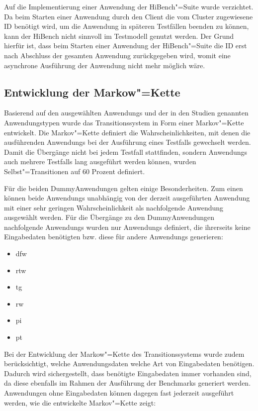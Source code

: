 Auf die Implementierung einer \gls{Anwendung} der HiBench"=Suite wurde verzichtet.
Da beim Starten einer \gls{Anwendung} durch den Client die vom Cluster zugewiesene ID benötigt wird, um die \gls{Anwendung} in späteren Testfällen beenden zu können, kann der HiBench nicht sinnvoll im Testmodell genutzt werden.
Der Grund hierfür ist, dass beim Starten einer \gls{Anwendung} der HiBench"=Suite die ID erst nach Abschluss der gesamten \gls{Anwendung} zurückgegeben wird, womit eine asynchrone Ausführung der \gls{Anwendung} nicht mehr möglich wäre.

\subsection{Entwicklung der Markow"=Kette}
\label{subsec:markovChain}

Basierend auf den ausgewählten \glspl{Anwendung} und der in den Studien genannten Anwendungstypen wurde das Transitionssystem in Form einer Markov"=Kette entwickelt.
Die Markov"=Kette definiert die Wahrscheinlichkeiten, mit denen die ausführenden \glspl{Anwendung} bei der Ausführung eines Testfalls gewechselt werden.
Damit die Übergänge nicht bei jedem \gls{Testfall} stattfinden, sondern \glspl{Anwendung} auch mehrere \glspl{Testfall} lang ausgeführt werden können, wurden Selbst"=Transitionen auf 60 Prozent definiert.

Für die beiden Dummy\gls{Anwendung}en gelten einige Besonderheiten.
Zum einen können beide \glspl{Anwendung} unabhängig von der derzeit ausgeführten \gls{Anwendung} mit einer sehr geringen Wahrscheinlichkeit als nachfolgende \gls{Anwendung} ausgewählt werden.
Für die Übergänge zu den Dummy\gls{Anwendung}en nachfolgende \glspl{Anwendung} wurden nur \glspl{Anwendung} definiert, die ihrerseits keine Eingabedaten benötigten bzw. diese für andere \glspl{Anwendung} generieren:

\begin{itemize}
    \item \acrlong{dfw}
    \item \acrlong{rtw}
    \item \acrlong{tg}
    \item \acrlong{rw}
    \item \acrlong{pi}
    \item \acrlong{pt}
\end{itemize}

Bei der Entwicklung der Markow"=Kette des Transitionssystems wurde zudem berücksichtigt, welche Anwendungsdaten welche Art von Eingabedaten benötigen.
Dadurch wird sichergestellt, dass benötigte Eingabedaten immer vorhanden sind, da diese ebenfalls im Rahmen der Ausführung der Benchmarks generiert werden.
Anwendungen ohne Eingabedaten können dagegen fast jederzeit ausgeführt werden, wie die entwickelte Markov"=Kette zeigt:

